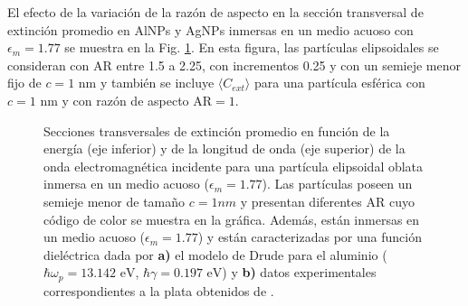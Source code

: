 El efecto de la variación de la razón de aspecto en la sección transversal de extinción promedio en AlNPs y AgNPs inmersas en un medio acuoso con $\epsilon_m=1.77$ se muestra en la Fig. \ref{aluminioplatac}. En esta figura, las partículas elipsoidales se consideran con AR entre 1.5 a 2.25, con incrementos 0.25 y con un semieje menor fijo de $c=1\text{ nm}$ y también se incluye $\langle C_{ext}\rangle$ para una partícula esférica con  $c=1\text{ nm}$ y con razón de aspecto AR$=1$.


\begin{figure}[h!]
	\quad%
	\caption{Secciones transversales de extinción promedio en función de la energía (eje inferior) y de la longitud de onda (eje superior) de la onda electromagnética incidente para una partícula elipsoidal oblata inmersa en un medio acuoso ($\epsilon_m=1.77$). Las partículas  poseen un semieje menor de tamaño $c=1nm$ y presentan diferentes AR cuyo código de color se muestra en la gráfica. Además, están inmersas en un medio acuoso ($\epsilon_m=1.77$) y están caracterizadas por una función dieléctrica dada por  \textbf{a)} el modelo de Drude para el aluminio ($\hbar\omega_p=13.142\text{ eV}$, $\hbar\gamma=0.197\text{ eV}$) y \textbf{b)} datos experimentales correspondientes a la plata obtenidos de \cite{Plata}.}\label{aluminioplatac}
\end{figure} 

